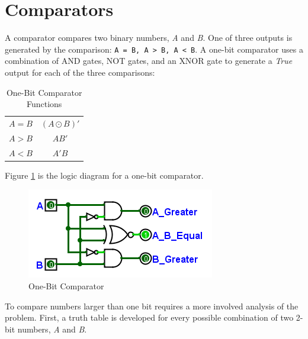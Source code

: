 \section{Comparators}
\label{CL:sec:comparators}

A comparator compares two binary numbers, \emph{A} and \emph{B}. One of three outputs is generated by the comparison: \lstinline[]|A = B, A > B, A < B|. A one-bit comparator uses a combination of \textsf{AND} gates, \textsf{NOT} gates, and an \textsf{XNOR} gate to generate a \emph{True} output for each of the three comparisons: 

\begin{table}[H]
	\sffamily
	\newcommand{\head}[1]{\textcolor{white}{\textbf{#1}}}    
	\begin{center}
		\begin{tabular}{cc} 
			$ A=B $ & $ (A \odot B)' $ \\
			$ A > B $ & $ AB' $ \\
			$ A < B $ & $ A'B $
		\end{tabular}
	\end{center}
	\caption{One-Bit Comparator Functions}
	\label{CL:tab:one-bit_comparator_functions}
\end{table}

Figure \ref{fig:08_12} is the logic diagram for a one-bit comparator.  

\begin{figure}[H]
	\centering
	\includegraphics[width=\maxwidth{.95\linewidth}]{gfx/08_12}
	\caption{One-Bit Comparator}
	\label{fig:08_12}
\end{figure}

To compare numbers larger than one bit requires a more involved analysis of the problem. First, a truth table is developed for every possible combination of two 2-bit numbers, \emph{A} and \emph{B}.

